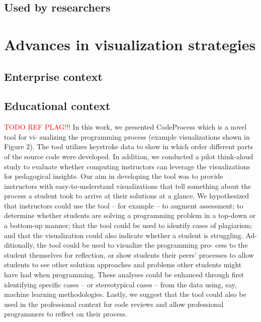 \subsection{Used by researchers}



\section{Advances in visualization strategies}
\subsection{Enterprise context}
\subsection{Educational context}

\textcolor{red}{TODO REF PLAG!!!}
In this work, we presented CodeProcess which is a novel tool for vi-
sualizing the programming process (example visualizations shown
in Figure 2). The tool utilizes keystroke data to show in which order
different parts of the source code were developed. In addition, we
conducted a pilot think-aloud study to evaluate whether computing
instructors can leverage the visualizations for pedagogical insights.
Our aim in developing the tool was to provide instructors with
easy-to-understand visualizations that tell something about the
process a student took to arrive at their solutions at a glance. We
hypothesized that instructors could use the tool – for example – to
augment assessment; to determine whether students are solving a
programming problem in a top-down or a bottom-up manner; that
the tool could be used to identify cases of plagiarism; and that the
visualization could also indicate whether a student is struggling. Ad-
ditionally, the tool could be used to visualize the programming pro-
cess to the student themselves for reflection, or show students their
peers’ processes to allow students to see other solution approaches
and problems other students might have had when programming.
These analyses could be enhanced through first identifying specific
cases – or stereotypical cases – from the data using, say, machine
learning methodologies.
Lastly, we suggest that the
tool could also be used in the professional context for code reviews
and allow professional programmers to reflect on their process.
